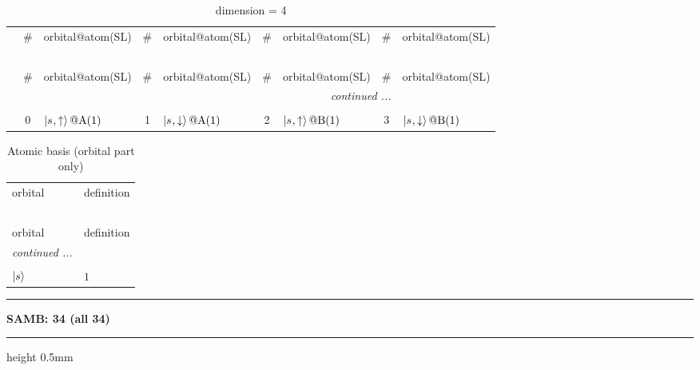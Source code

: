 \documentclass[fleqn,10pt,landscape]{jsarticle}
\begin{document}
\renewcommand{\arraystretch}{1.6}
\begin{longtable}[l]{c|cl|cl|cl|cl}
\captionsetup{justification=raggedright, singlelinecheck=off}
\caption{dimension = 4}
 \\
 \hline \hline
 & \# & orbital@atom(SL) & \# & orbital@atom(SL) & \# & orbital@atom(SL) & \# & orbital@atom(SL) \\ \hline \endfirsthead

\multicolumn{8}{l}{\tablename\ \thetable{}} \\
 \hline \hline
 & \# & orbital@atom(SL) & \# & orbital@atom(SL) & \# & orbital@atom(SL) & \# & orbital@atom(SL) \\ \hline \endhead

 \hline \hline
\multicolumn{8}{r}{\footnotesize\it continued ...} \\ \endfoot

 \hline \hline
\multicolumn{8}{r}{} \\ \endlastfoot

 & 0 & $\ket{s_{},\uparrow}@{\rm A}(1)$ & 1 & $\ket{s_{},\downarrow}@{\rm A}(1)$ & 2 & $\ket{s_{},\uparrow}@{\rm B}(1)$ & 3 & $\ket{s_{},\downarrow}@{\rm B}(1)$ \\
\end{longtable}
\renewcommand{\arraystretch}{1.6}
\begin{longtable}[l]{ll}
\captionsetup{justification=raggedright, singlelinecheck=off}
\caption{Atomic basis (orbital part only)}
 \\
 \hline \hline
orbital & definition \\ \hline \endfirsthead

\multicolumn{1}{l}{\tablename\ \thetable{}} \\
 \hline \hline
orbital & definition \\ \hline \endhead

 \hline \hline
\multicolumn{1}{r}{\footnotesize\it continued ...} \\ \endfoot

 \hline \hline
\multicolumn{1}{r}{} \\ \endlastfoot

$ \ket{s} $ & $ 1 $ \\
\end{longtable}
\vspace{5mm}
\noindent \rule[0.5mm]{5mm}{0.5mm}\hspace{3mm}\textbf{SAMB: 34 (all 34)}\hspace{3mm}\leaders\hrule height 0.5mm\hfill\kern0pt
\vspace{3mm}
\end{document}

